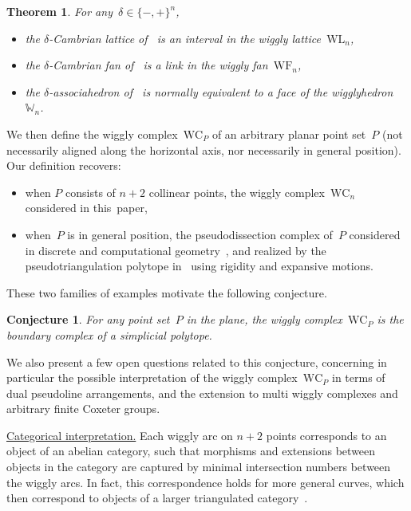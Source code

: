\documentclass{amsart}
\newtheorem*{theorem*}{Theorem}%
\newtheorem*{conjecture*}{Conjecture}%
\theoremstyle{definition}
\newcommand{\para}[1]{\smallskip\noindent\uline{#1.}} %
\newcommand{\polytope}[1]{\mathds{#1}} %
\newcommand{\wigglyComplex}{\mathrm{WC}} %
\newcommand{\wigglyLattice}{\mathrm{WL}} %
\newcommand{\wigglyFan}{\mathrm{WF}} %
\newcommand{\wigglyhedron}{\polytope{W}} %
\begin{document}
\begin{theorem*}
For any~$\delta \in \{-,+\}^n$,
\begin{itemize}
\item the $\delta$-Cambrian lattice of~\cite{Reading-CambrianLattices} is an interval in the wiggly lattice~$\wigglyLattice_n$,
\item the $\delta$-Cambrian fan of~\cite{ReadingSpeyer} is a link in the wiggly fan~$\wigglyFan_n$,
\item the $\delta$-associahedron of~\cite{HohlwegLange} is normally equivalent to a face of the wigglyhedron~$\wigglyhedron_n$.
\end{itemize}
\end{theorem*}

We then define the wiggly complex~$\wigglyComplex_P$ of an arbitrary planar point set~$P$ (not necessarily aligned along the horizontal axis, nor necessarily in general position).
Our definition recovers:
\begin{itemize}
\item when $P$ consists of $n+2$ collinear points, the wiggly complex~$\wigglyComplex_n$ considered in this~paper,
\item when~$P$ is in general position, the pseudodissection complex of~$P$ considered in discrete and computational geometry~\cite{PocchiolaVegter,RoteSantosStreinu-pseudotriangulations}, and realized by the pseudotriangulation polytope in~\cite{RoteSantosStreinu-polytope} using rigidity and expansive motions.
\end{itemize}
These two families of examples motivate the following conjecture.

\begin{conjecture*}
For any point set~$P$ in the plane, the wiggly complex~$\wigglyComplex_P$ is the boundary complex of a simplicial polytope.
\end{conjecture*}

We also present a few open questions related to this conjecture, concerning in particular the possible interpretation of the wiggly complex~$\wigglyComplex_P$ in terms of dual pseudoline arrangements, and the extension to multi wiggly complexes and arbitrary finite Coxeter groups.

\pagebreak
\para{Categorical interpretation}
Each wiggly arc on \(n+2\) points corresponds to an object of an abelian category, such that morphisms and extensions between objects in the category are captured by minimal intersection numbers between the wiggly arcs.
In fact, this correspondence holds for more general curves, which then correspond to objects of a larger triangulated category~\cite{kho.sei:02}.
\end{document}
